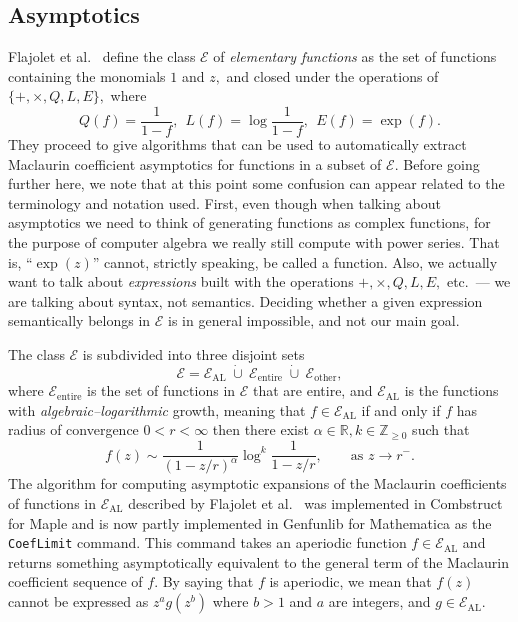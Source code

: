 \documentclass{article}
\theoremstyle{plain}
\newcommand{\codefont}[1]{{\fontshape{n}\texttt{#1}}}
\begin{document}
\subsection{Asymptotics} \label{sub:asympt}

Flajolet et al.\ \cite{auto} define the class \( \mathcal{E} \) of
\emph{elementary functions} as the set of functions containing the
monomials \(1\) and \( z, \) and closed under the operations
of \( \{+,\times,Q,L,E \}, \) where
\[ Q(f)=\frac{1}{1-f}, \ \ L(f)=\log\frac{1}{1-f}, \ \ E(f)=\exp(f). \]
They proceed to give algorithms that can be used to automatically extract
Maclaurin coefficient asymptotics for functions in a subset of
\( \mathcal{E}.  \)
Before going further here, we note that at this point some confusion can appear
related to the terminology and notation used.
First, even though when talking about asymptotics we need to think of
generating functions as complex functions, for the purpose of computer
algebra we really still compute with power series.
That is, ``\( \exp(z) \)'' cannot, strictly speaking, be called a function.
Also, we actually want to talk about \emph{expressions}
built with the operations \( +, \times, Q, L, E, \) etc.\ --- we are talking
about syntax, not semantics.
Deciding whether a given expression semantically belongs in \( \mathcal{E} \)
is in general impossible, and not our main goal.

The class \( \mathcal{E} \) is subdivided into three disjoint sets
\[ \mathcal{E} = \mathcal{E}_{\text{AL}} \hspace{3pt} \dot{\cup} \hspace{3pt}
    \mathcal{E}_{\text{entire}} \hspace{3pt} \dot{\cup} \hspace{3pt}
    \mathcal{E}_{\text{other}}, \]
where \( \mathcal{E}_{\text{entire}} \) is the set of functions in
\( \mathcal{E} \) that are entire, and \( \mathcal{E}_{\text{AL}} \) is the
functions with \emph{algebraic--logarithmic} growth, meaning that \( f \in
\mathcal{E}_{\text{AL}} \) if and only if \( f \) has radius of convergence \(
0 < r < \infty \) then there exist
\( \alpha \in \mathbb{R}, k \in \mathbb{Z}_{\geq 0} \)
such that
\[ f(z) \sim \frac{1}{(1-z/r)^\alpha} \log^k \frac{1}{1-z/r}, \qquad \text{as }
z \rightarrow r^{-}. \]
The algorithm for computing asymptotic expansions of the Maclaurin coefficients
of functions in \( \mathcal{E}_{\text{AL}} \) described by Flajolet et al.\
\cite{auto} was implemented in Combstruct for Maple and is now partly
implemented in Genfunlib for Mathematica as the \codefont{CoefLimit} command.
This command takes an aperiodic function \( f \in \mathcal{E}_{\text{AL}} \) and
returns something asymptotically equivalent to the general term of the
Maclaurin coefficient sequence of \( f. \)
By saying that \( f \) is aperiodic, we mean that \( f(z) \) cannot be expressed
as \( z^a g(z^b) \) where \(b>1 \) and \( a \) are integers, and \( g \in
\mathcal{E}_{\text{AL}}.\)
\end{document}
